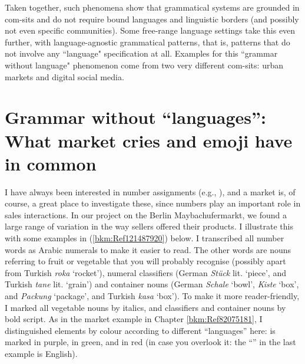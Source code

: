 \hspace*{-1.2pt}Taken together, such phenomena show that grammatical systems are grounded in com-sits and do not require bound languages and linguistic borders (and possibly not even specific communities). Some free-range language settings take this even further, with language-agnostic grammatical patterns, that is, patterns that do not involve any “language" specification at all. Examples for this “grammar without language" phenomenon come from two very different com-sits: urban markets and digital social media.

\section[Grammar without ``languages'': market cries and emojis]{Grammar without “languages'': What market cries and emoji have in common}
\label{bkm:Ref119923192}\hypertarget{Toc125444662}{}
\largerpage
I have always been interested in number assignments (e.g., \citealt{Wiese2003}), and a market is, of course, a great place to investigate these, since numbers play an important role in sales interactions. In our project on the Berlin Maybachufermarkt, we found a large range of variation in the way sellers offered their products. I illustrate this with some examples in (\ref{bkm:Ref121487920}) below. I transcribed all number words as Arabic numerals to make it easier to read. The other words are nouns referring to fruit or vegetable that you will probably recognise (possibly apart from Turkish \textit{roka} ‘rocket’), numeral classifiers (German \textit{Stück} lit. ‘piece’, and Turkish \textit{tane} lit. ‘grain’) and container nouns (German \textit{Schale} ‘bowl’, \textit{Kiste} ‘box’, and \textit{Packung} ‘package’, and Turkish \textit{kasa} ‘box’). To make it more reader-friendly, I marked all vegetable nouns by italics, and classifiers and container nouns by bold script. As in the market example in Chapter \ref{bkm:Ref82075181}, I distinguished elements by colour according to different ``languages'' here:  is marked in purple,  in green, and  in red (in case you overlook it: the “” in the last example is English).

